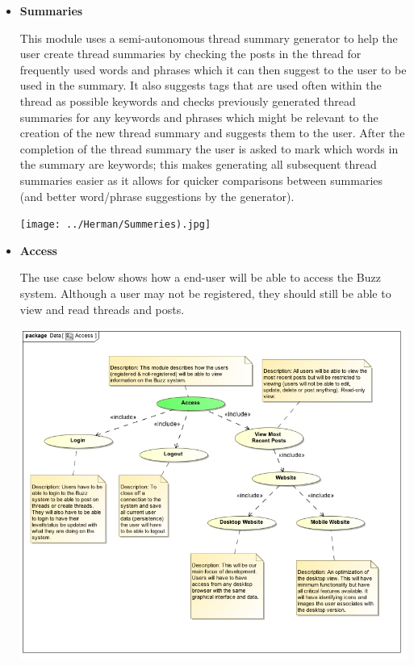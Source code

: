 \documentclass[a4paper,12pt]{report}
\begin{document}
\begin{itemize}
\begin{center}
		\end{center}
	\item \textbf{Summaries}
		\begin{flushleft} This module uses a semi-autonomous thread summary generator to help the user create thread summaries by checking the posts in the thread for frequently used words and phrases which it can then suggest to the user to be used in the summary. It also suggests tags that are used often within the thread as possible keywords and checks previously generated thread summaries for any keywords and phrases which might be relevant to the creation of the new thread summary and suggests them to the user. After the completion of the thread summary the user is asked to mark which words in the summary are keywords; this makes generating all subsequent thread summaries easier as it allows for quicker comparisons between summaries (and better word/phrase suggestions by the generator).
		\end{flushleft}
		\begin{center}
		\texttt{[image: ../Herman/Summeries).jpg]}\\[0.4cm]
		\end{center}
	\item \textbf{Access}
		\begin{flushleft}
		The use case below shows how a end-user will be able to access the Buzz system. Although a user may not be registered, they should still be able to view and read threads and posts.
		\end{flushleft}
		\begin{center}
		\includegraphics[width=1\textwidth]{../Jason/Access.jpg}\\[0.4cm]

\end{center}
\end{itemize}
\end{document}
